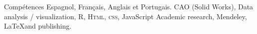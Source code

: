 
\begin{rubric}{Compétences}
\entry*[Langues]
	Espagnol, Français, Anglais et Portugais.
	CAO (Solid Works), Data analysis / visualization, R, \textsc{Html, css}, JavaScript 
\entry*[Misc.]
	Academic research, Mendeley, \LaTeX and publishing.
\end{rubric}
